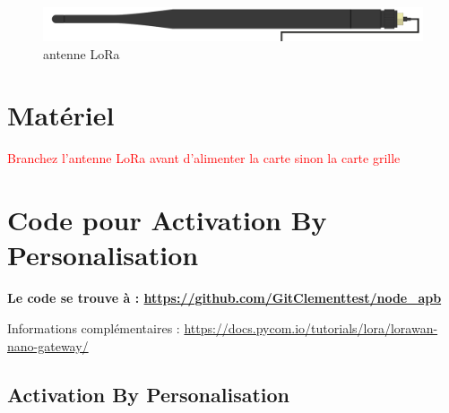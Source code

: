 \documentclass{article}
\begin{document}
    \begin{figure}[H]
\begin{center}
\advance\leftskip-3cm
\advance\rightskip-3cm
\includegraphics[keepaspectratio=true,scale=0.2]{lora_antenna.png}
\caption{antenne LoRa}
\label{visina8}
\end{center}\end{figure}



\section{Matériel}
\textcolor{red}{Branchez l'antenne LoRa avant d'alimenter la carte sinon la carte grille}





\section{Code pour Activation By Personalisation}



\textbf{Le code se trouve à : \url{https://github.com/GitClementtest/node_apb}}

Informations complémentaires : \url{https://docs.pycom.io/tutorials/lora/lorawan-nano-gateway/}\\

\subsection{Activation By Personalisation}
\end{document}
